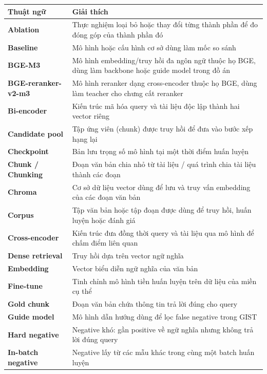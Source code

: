\documentclass[../DoAn.tex]{subfiles}
\begin{document}
\begingroup
\small
\setlength{\tabcolsep}{4pt}
\begin{longtable}{>{\raggedright\arraybackslash}p{4cm} >{\raggedright\arraybackslash}p{10cm}}
	\hline
	\textbf{Thuật ngữ} & \textbf{Giải thích} \\ \hline
	\endhead
	\textbf{Ablation} & Thực nghiệm loại bỏ hoặc thay đổi từng thành phần để đo đóng góp của thành phần đó \\
	\textbf{Baseline} & Mô hình hoặc cấu hình cơ sở dùng làm mốc so sánh \\
	\textbf{BGE-M3} & Mô hình embedding/truy hồi đa ngôn ngữ thuộc họ BGE, dùng làm backbone hoặc guide model trong đồ án \\
	\textbf{BGE-reranker-v2-m3} & Mô hình reranker dạng cross-encoder thuộc họ BGE, dùng làm teacher cho chưng cất reranker \\
	\textbf{Bi-encoder} & Kiến trúc mã hóa query và tài liệu độc lập thành hai vector riêng \\
	\textbf{Candidate pool} & Tập ứng viên (chunk) được truy hồi để đưa vào bước xếp hạng lại \\
	\textbf{Checkpoint} & Bản lưu trọng số mô hình tại một thời điểm huấn luyện \\
	\textbf{Chunk / Chunking} & Đoạn văn bản chia nhỏ từ tài liệu / quá trình chia tài liệu thành các đoạn \\
	\textbf{Chroma} & Cơ sở dữ liệu vector dùng để lưu và truy vấn embedding của các đoạn văn bản \\
	\textbf{Corpus} & Tập văn bản hoặc tập đoạn được dùng để truy hồi, huấn luyện hoặc đánh giá \\
	\textbf{Cross-encoder} & Kiến trúc đưa đồng thời query và tài liệu qua mô hình để chấm điểm liên quan \\
	\textbf{Dense retrieval} & Truy hồi dựa trên vector ngữ nghĩa \\
	\textbf{Embedding} & Vector biểu diễn ngữ nghĩa của văn bản \\
	\textbf{Fine-tune} & Tinh chỉnh mô hình tiền huấn luyện trên dữ liệu của miền cụ thể \\
	\textbf{Gold chunk} & Đoạn văn bản chứa thông tin trả lời đúng cho query \\
	\textbf{Guide model} & Mô hình dẫn hướng dùng để lọc false negative trong GIST \\
	\textbf{Hard negative} & Negative khó: gần positive về ngữ nghĩa nhưng không trả lời đúng query \\
	\textbf{In-batch negative} & Negative lấy từ các mẫu khác trong cùng một batch huấn luyện \\

\end{longtable}
\end{document}
